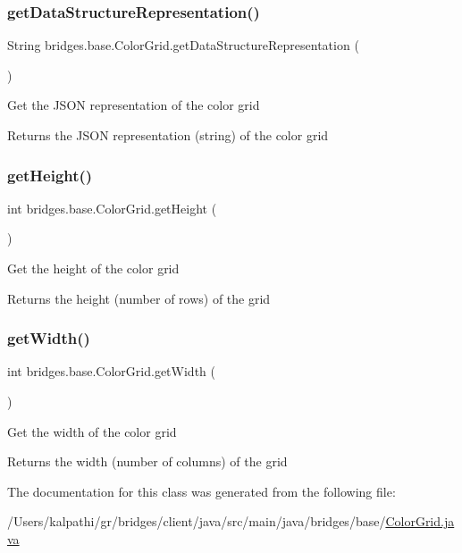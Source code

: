 \subsubsection{\texorpdfstring{get\+Data\+Structure\+Representation()}{getDataStructureRepresentation()}}
{\footnotesize\ttfamily String bridges.\+base.\+Color\+Grid.\+get\+Data\+Structure\+Representation (\begin{DoxyParamCaption}{ }\end{DoxyParamCaption})}

Get the J\+S\+ON representation of the color grid

\begin{DoxyReturn}{Returns}
the J\+S\+ON representation (string) of the color grid 
\end{DoxyReturn}
\mbox{\label{classbridges_1_1base_1_1_color_grid_a8793791e35f03b3e5a2e5ef3606ac124}} 
\subsubsection{\texorpdfstring{get\+Height()}{getHeight()}}
{\footnotesize\ttfamily int bridges.\+base.\+Color\+Grid.\+get\+Height (\begin{DoxyParamCaption}{ }\end{DoxyParamCaption})}

Get the height of the color grid

\begin{DoxyReturn}{Returns}
the height (number of rows) of the grid 
\end{DoxyReturn}
\mbox{\label{classbridges_1_1base_1_1_color_grid_af872226de86ac8e8f2553fdc5bddc375}} 
\subsubsection{\texorpdfstring{get\+Width()}{getWidth()}}
{\footnotesize\ttfamily int bridges.\+base.\+Color\+Grid.\+get\+Width (\begin{DoxyParamCaption}{ }\end{DoxyParamCaption})}

Get the width of the color grid

\begin{DoxyReturn}{Returns}
the width (number of columns) of the grid 
\end{DoxyReturn}


The documentation for this class was generated from the following file\+:\begin{DoxyCompactItemize}
\item 
/\+Users/kalpathi/gr/bridges/client/java/src/main/java/bridges/base/\mbox{\hyperlink{_color_grid_8java}{Color\+Grid.\+java}}\end{DoxyCompactItemize}
